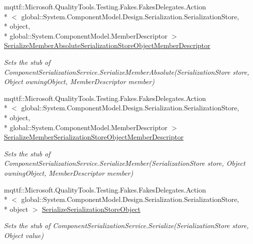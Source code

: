 \begin{DoxyCompactItemize}
mqttf\-::\-Microsoft.\-Quality\-Tools.\-Testing.\-Fakes.\-Fakes\-Delegates.\-Action\\*
$<$ global\-::\-System.\-Component\-Model.\-Design.\-Serialization.\-Serialization\-Store, \\*
object, \\*
global\-::\-System.\-Component\-Model.\-Member\-Descriptor $>$ \hyperlink{class_system_1_1_component_model_1_1_design_1_1_serialization_1_1_fakes_1_1_stub_component_serialization_service_ac327db861a75c2327f6f522723a6975d}{Serialize\-Member\-Absolute\-Serialization\-Store\-Object\-Member\-Descriptor}
\begin{DoxyCompactList}\small\item\em Sets the stub of Component\-Serialization\-Service.\-Serialize\-Member\-Absolute(\-Serialization\-Store store, Object owning\-Object, Member\-Descriptor member)\end{DoxyCompactList}\item 
mqttf\-::\-Microsoft.\-Quality\-Tools.\-Testing.\-Fakes.\-Fakes\-Delegates.\-Action\\*
$<$ global\-::\-System.\-Component\-Model.\-Design.\-Serialization.\-Serialization\-Store, \\*
object, \\*
global\-::\-System.\-Component\-Model.\-Member\-Descriptor $>$ \hyperlink{class_system_1_1_component_model_1_1_design_1_1_serialization_1_1_fakes_1_1_stub_component_serialization_service_a3c3a5a714e7f35ca8ed772a3584b7385}{Serialize\-Member\-Serialization\-Store\-Object\-Member\-Descriptor}
\begin{DoxyCompactList}\small\item\em Sets the stub of Component\-Serialization\-Service.\-Serialize\-Member(\-Serialization\-Store store, Object owning\-Object, Member\-Descriptor member)\end{DoxyCompactList}\item 
mqttf\-::\-Microsoft.\-Quality\-Tools.\-Testing.\-Fakes.\-Fakes\-Delegates.\-Action\\*
$<$ global\-::\-System.\-Component\-Model.\-Design.\-Serialization.\-Serialization\-Store, \\*
object $>$ \hyperlink{class_system_1_1_component_model_1_1_design_1_1_serialization_1_1_fakes_1_1_stub_component_serialization_service_a1002f392f7d876500f5ed3fdcd03c632}{Serialize\-Serialization\-Store\-Object}
\begin{DoxyCompactList}\small\item\em Sets the stub of Component\-Serialization\-Service.\-Serialize(\-Serialization\-Store store, Object value)\end{DoxyCompactList}\end{DoxyCompactItemize}
